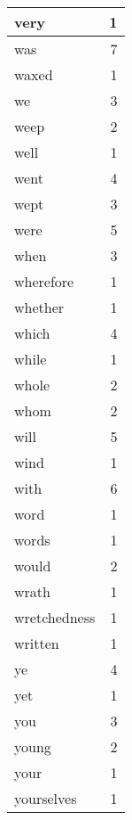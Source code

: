 \begin{center}
\begin{longtable}{l|r}
very & 1 \\ \hline
was & 7 \\ \hline
waxed & 1 \\ \hline
we & 3 \\ \hline
weep & 2 \\ \hline
well & 1 \\ \hline
went & 4 \\ \hline
wept & 3 \\ \hline
were & 5 \\ \hline
when & 3 \\ \hline
wherefore & 1 \\ \hline
whether & 1 \\ \hline
which & 4 \\ \hline
while & 1 \\ \hline
whole & 2 \\ \hline
whom & 2 \\ \hline
will & 5 \\ \hline
wind & 1 \\ \hline
with & 6 \\ \hline
word & 1 \\ \hline
words & 1 \\ \hline
would & 2 \\ \hline
wrath & 1 \\ \hline
wretchedness & 1 \\ \hline
written & 1 \\ \hline
ye & 4 \\ \hline
yet & 1 \\ \hline
you & 3 \\ \hline
young & 2 \\ \hline
your & 1 \\ \hline
yourselves & 1 \\ \hline
\end{longtable}
\end{center}



\normalsize



